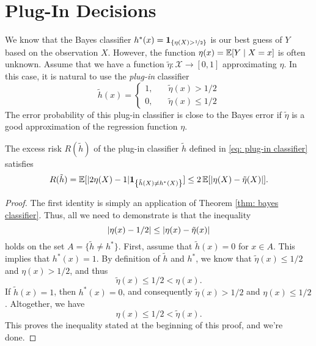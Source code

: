 \section{Plug-In Decisions}
\label{subsec: plug-in decisions}

We know that the Bayes classifier $h^*(x) = \indSet{\eta(X) > \nicefrac{1}{2}}$ is our best guess of $Y$ based on the observation $X$. However, the function $\eta(x) = \operatorname{\mathbb{E}}[Y \mathrel{|} X = x]$ is often unknown. Assume that we have a function $\tilde{\eta} \colon \mathcal{X} \to [0, 1]$ approximating $\eta$. In this case, it is natural to use the \emph{plug-in} classifier
\begin{equation}
\label{eq: plug-in classifier}
    \tilde{h}(x) = \begin{cases}
        1, \quad & \tilde{\eta}(x) > 1/2 \\
        0, \quad & \tilde{\eta}(x) \leq 1/2
    \end{cases}
\end{equation}
The error probability of this plug-in classifier is close to the Bayes error if $\tilde{\eta}$ is a good approximation of the regression function $\eta$.

\begin{theorem}
\label{thm: plug-in decision}
The excess risk $R(\tilde{h})$ of the plug-in classifier $\tilde{h}$ defined in \eqref{eq: plug-in classifier} satisfies
\[
    R(\tilde{h}) = \Exp[\abs{2\eta(X) - 1} \indSet{\tilde{h}(X) \neq h^*(X)}] \leq 2 \Exp[\abs{\eta(X) - \tilde{\eta}(X)}].
\]
\end{theorem}

\begin{proof}
The first identity is simply an application of Theorem \ref{thm: bayes classifier}. Thus, all we need to demonstrate is that the inequality
\[
    \abs{\eta(x) - 1/2} \leq \abs{\eta(x) - \tilde{\eta}(x)}
\]
holds on the set $A = \{ \tilde{h} \neq h^* \}$. First, assume that $\tilde{h}(x) = 0$ for $x \in A$. This implies that $h^*(x) = 1$. By definition of $\tilde{h}$ and $h^*$, we know that $\tilde{\eta}(x) \leq 1/2$ and $\eta(x) > 1/2$, and thus
\[
    \tilde{\eta}(x) \leq 1/2 < \eta(x).
\]
If $\tilde{h}(x) = 1$, then $h^*(x) = 0$, and consequently $\tilde{\eta}(x) > 1/2$ and $\eta(x) \leq 1/2$. Altogether, we have
\[
    \eta(x) \leq 1/2 < \tilde{\eta}(x).
\]
This proves the inequality stated at the beginning of this proof, and we're done.
\end{proof}

